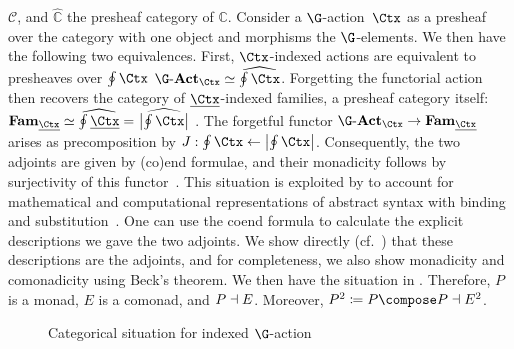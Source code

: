 $\mathcal C$, and $\hat{\mathbb C}$ the presheaf category of $\mathbb
C$. Consider a $\G$-action~$\Ctx$ as a presheaf over the category with one
object and morphisms the $\G$-elements. We then have the following two equivalences. First, $\Ctx$-indexed actions
are equivalent to presheaves over $\oint\Ctx$
\(
\Action\G_{\Ctx}\simeq \widehat{\oint\Ctx}
\). Forgetting the functorial action then recovers the category of
$\carrier\Ctx$-indexed families, a presheaf category itself:
\(
\Fam_{\carrier\Ctx} \simeq \widehat{\oint{\carrier\Ctx}} = \mspace{-5mu}\widehat{\ {\abs{\oint\Ctx}}\ }
\).
The forgetful functor $\Action\G_{\Ctx} \to \Fam_{\carrier\Ctx}$
arises as precomposition by $J: {\oint\Ctx} \from \abs{{\oint\Ctx}} $.
Consequently, the two adjoints are given by (co)end
formulae, and their monadicity follows by surjectivity of this
functor~\cite[Prop.~1.1]{fiore-menni:reflective-kleisli-subcategories}.
This situation is exploited by
\citeauthor{fiore-szamozvancev:soas-theory} to account for
mathematical and computational representations of abstract syntax with
binding and substitution~\cite{fiore-szamozvancev:formal-soas,%
  fiore-szamozvancev:soas-theory,%
  szamozvancev:thesis}.
One can use the coend formula to calculate the explicit descriptions
we gave the two adjoints. We show directly
(cf.~) that these descriptions are the
adjoints, and for completeness, we also show monadicity and comonadicity using
Beck's theorem. We then have the situation in .
Therefore, $P$ is a monad, $E$ is a comonad, and $P \dashv E$.
Moreover, $P^2 \definedby P\compose P \leftadjointto E^2$.
\begin{figure}
  \caption{Categorical situation for indexed $\G$-action}
\end{figure}

